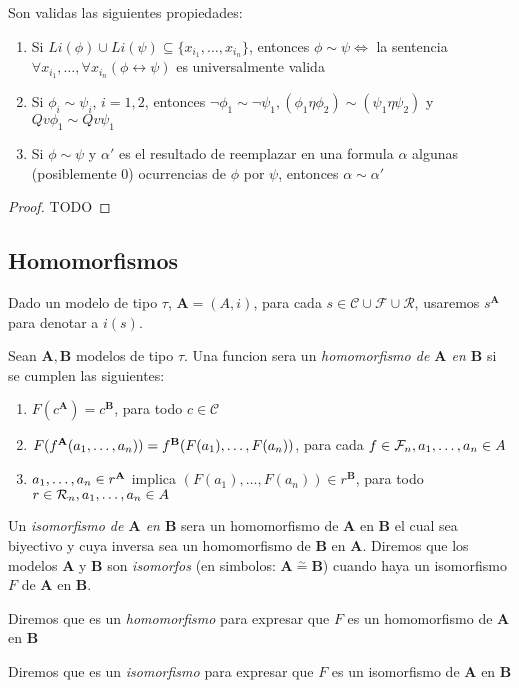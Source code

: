 \begin{lemma}
  Son validas las siguientes propiedades:
  \begin{enumerate}
    \item Si $Li(\phi) \cup Li(\psi) \subseteq \{x_{i_1}, \dots, x_{i_n}\}$, entonces $\phi \sim \psi \iff$ la sentencia $\forall x_{i_1},\dots,\forall x_{i_n}(\phi \leftrightarrow \psi)$ es universalmente valida
    \item Si $\phi_i \sim \psi_i$, $i = 1, 2$, entonces $\neg\phi_1 \sim \neg\psi_1, (\phi_1\eta\phi_2)\sim(\psi_1\eta\psi_2)$ y $Qv\phi_1\sim Qv\psi_1$
    \item Si $\phi\sim\psi$ y $\alpha'$ es el resultado de reemplazar en una formula $\alpha$ algunas (posiblemente 0) ocurrencias de $\phi$ por $\psi$, entonces $\alpha \sim \alpha'$ 
  \end{enumerate}
\end{lemma}
\begin{proof}
  TODO
\end{proof}

\subsection{Homomorfismos}
\begin{definition}
  Dado un modelo de tipo $\tau$, $\mathbf{A} = (A, i)$, para cada $s\in\mathcal{C}\cup\mathcal{F}\cup\mathcal{R}$, usaremos $s^\mathbf{A}$
  para denotar a $i(s)$.
\end{definition}

\begin{definition}
  Sean $\mathbf{A}, \mathbf{B}$ modelos de tipo $\tau$. Una funcion  sera un \emph{homomorfismo de $\mathbf{A}$ en $\mathbf{B}$}
  si se cumplen las siguientes: \begin{enumerate}
    \item $F(c^\mathbf{A}) = c^\mathbf{B}$, para todo $c \in \mathcal{C}$
    \item $F(f^\mathbf{A}(a_{1}, \dots, a_{n})) = f^\mathbf{B}(F(a_1), \dots, F(a_n))$, para cada $f \in \mathcal{F}_n, a_{1}, \dots, a_{n} \in A$
    \item $a_{1}, \dots, a_{n} \in r^\mathbf{A}$ implica $(F(a_1), \dots, F(a_n)) \in r^\mathbf{B}$, para todo $r \in \mathcal{R}_n, a_{1}, \dots, a_{n}\in A$
  \end{enumerate}

  Un \emph{isomorfismo de $\mathbf{A}$ en $\mathbf{B}$} sera un homomorfismo de $\mathbf{A}$ en $\mathbf{B}$ el cual sea biyectivo y cuya inversa
  sea un homomorfismo de $\mathbf{B}$ en $\mathbf{A}$. Diremos que los modelos $\mathbf{A}$ y $\mathbf{B}$ son \emph{isomorfos} (en simbolos: $\mathbf{A} \overset{\sim}{=} \mathbf{B}$) 
  cuando haya un isomorfismo $F$ de $\mathbf{A}$ en $\mathbf{B}$.

  Diremos que  es un \emph{homomorfismo} para expresar que $F$ es un homomorfismo de $\mathbf{A}$ en $\mathbf{B}$

  Diremos que  es un \emph{isomorfismo} para expresar que $F$ es un isomorfismo de $\mathbf{A}$ en $\mathbf{B}$
\end{definition}

